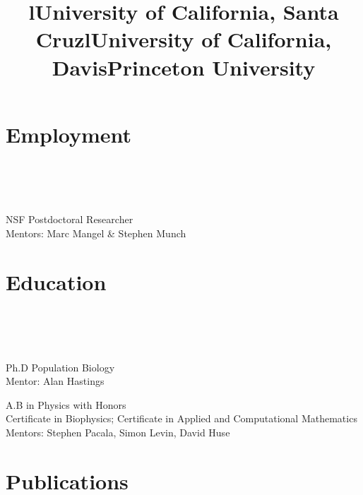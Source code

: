 \documentclass[margin]{res}
\begin{document}
\begin{resume}

\section{Employment}
\begin{format}
\title{l}\\\\
\body\\
\end{format}

\title{\textbf{University of California, Santa Cruz}}
\begin{position}
NSF Postdoctoral Researcher \\
Mentors: Marc Mangel \& Stephen Munch 
\end{position}

\section{Education}
\begin{format}
\title{l}\\\\
\body\\
\end{format}

\title{\textbf{University of California, Davis}}
\begin{position}
Ph.D Population Biology \\
Mentor: Alan Hastings
\end{position}

\title{\textbf{Princeton University}}
\begin{position}
A.B  in Physics with Honors \\ 
Certificate in Biophysics; Certificate in Applied and Computational Mathematics\\
Mentors: Stephen Pacala, Simon Levin, David Huse
\end{position}

\section{Publications}


\end{resume}
\end{document}
